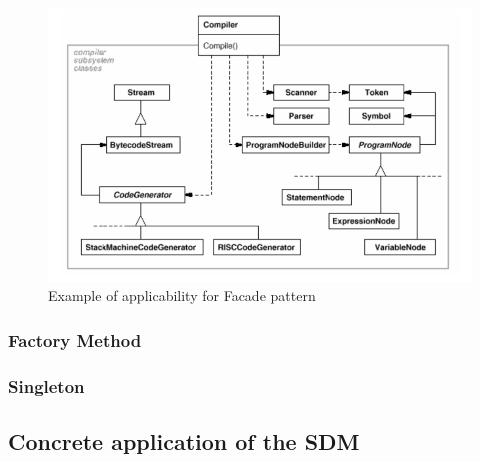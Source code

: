\documentclass{article}[11]
\begin{document}
	\begin{figure}[H]
		\includegraphics[scale=0.9]{./imgs/Facade}
		\caption{Example of applicability for Facade pattern  \cite{gamma1995design}}
	\end{figure}
	
	\subsubsection{Factory Method}
	\subsubsection{Singleton}

\subsection{Concrete application of the SDM}

\printacronyms[include-classes=abbrev,name=Abbreviations]




\end{document}
